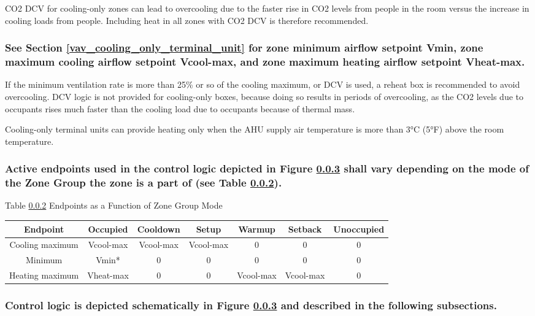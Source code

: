 \documentclass[10pt]{article}
\begin{document}
CO2 DCV for cooling-only zones can lead to overcooling due to the faster rise in CO2 levels from people in the room versus the increase in cooling loads from people. Including heat in all zones with CO2 DCV is therefore recommended. 

\subsubsection{See Section \ref{vav_cooling_only_terminal_unit} for zone minimum airflow setpoint Vmin, zone maximum cooling airflow setpoint Vcool-max, and zone maximum heating airflow setpoint Vheat-max.}

If the minimum ventilation rate is more than 25\% or so of the cooling maximum, or DCV is used, a reheat box is recommended to avoid overcooling. DCV logic is not provided for cooling-only boxes, because doing so results in periods of overcooling, as the CO2 levels due to occupants rises much faster than the cooling load due to occupants because of thermal mass.

Cooling-only terminal units can provide heating only when the AHU supply air temperature is more than 3°C (5°F) above the room temperature.

\subsubsection{Active endpoints used in the control logic depicted in Figure \ref{figure:control_logic} shall vary depending on the mode of the Zone Group the zone is a part of (see Table \ref{figure:zone_group_mode}).}

\label{figure:zone_group_mode}
\begin{center}
Table \ref{figure:zone_group_mode} Endpoints as a Function of Zone Group Mode 
\end{center}
%
\begin{tabular}{ c|c|c|c|c|c|c } 
 \hline
 Endpoint & Occupied & Cooldown & Setup & Warmup & Setback & Unoccupied \\ 
 \hline
 Cooling maximum & Vcool-max & Vcool-max & Vcool-max & 0 & 0 & 0 \\ 
 \hline
 Minimum & Vmin* & 0 & 0 & 0 & 0 & 0 \\ 
 \hline
 Heating maximum & Vheat-max & 0 & 0 & Vcool-max & Vcool-max & 0 \\ 
 \hline
\end{tabular}

\subsubsection{Control logic is depicted schematically in Figure \ref{figure:control_logic} and described in the following subsections.} \label{figure:control_logic}
\end{document}
